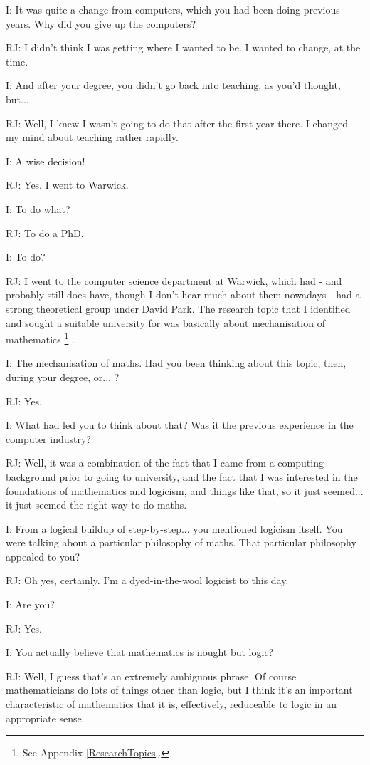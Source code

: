 \documentclass[10pt,titlepage]{book}
\begin{document}
I: It was quite a change from computers, which you had been doing previous years. Why did you give up the computers?

RJ: I didn't think I was getting where I wanted to be. I wanted to change, at the time.

I: And after your degree, you didn't go back into teaching, as you'd thought, but...

RJ: Well, I knew I wasn't going to do that after the first year there. I changed my mind about teaching rather rapidly.

I: A wise decision!

RJ: Yes. I went to Warwick.

I: To do what?

RJ: To do a PhD.

I: To do?

RJ: I went to the computer science department at Warwick, which had - and probably still does have, though I don't hear much about them nowadays - had a strong theoretical group under David Park. The research topic that I identified and sought a suitable university for was basically about mechanisation of mathematics%
\footnote{
See Appendix \ref{ResearchTopics}.}%
.

I: The mechanisation of maths. Had you been thinking about this topic, then, during your degree, or... ?

RJ: Yes.

I: What had led you to think about that? Was it the previous experience in the computer industry?

RJ: Well, it was a combination of the fact that I came from a computing background prior to going to university, and the fact that I was interested in the foundations of mathematics and logicism, and things like that, so it just seemed... it just seemed the right way to do maths.

I: From a logical buildup of step-by-step... you mentioned logicism itself. You were talking about a particular philosophy of maths. That particular philosophy appealed to you?

RJ: Oh yes, certainly. I'm a dyed-in-the-wool logicist to this day.

I: Are you?

RJ: Yes.

I: You actually believe that mathematics is nought but logic?

RJ: Well, I guess that's an extremely ambiguous phrase.
Of course mathematicians do lots of things other than logic, but I think it's an important characteristic of mathematics that it is, effectively, reduceable to logic in an appropriate sense.
\end{document}
